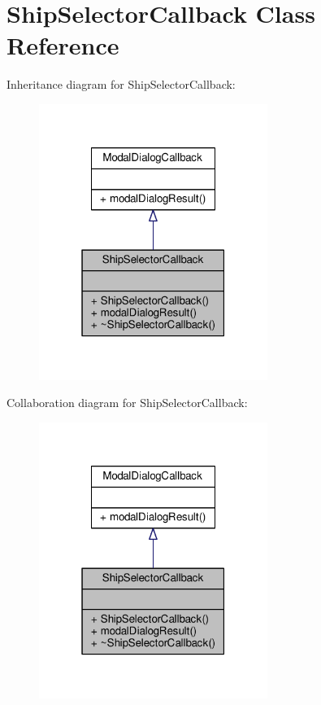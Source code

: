 \hypertarget{classShipSelectorCallback}{}\section{Ship\+Selector\+Callback Class Reference}
\label{classShipSelectorCallback}


Inheritance diagram for Ship\+Selector\+Callback\+:
\nopagebreak
\begin{figure}[H]
\begin{center}
\leavevmode
\includegraphics[width=211pt]{df/dfc/classShipSelectorCallback__inherit__graph}
\end{center}
\end{figure}


Collaboration diagram for Ship\+Selector\+Callback\+:
\nopagebreak
\begin{figure}[H]
\begin{center}
\leavevmode
\includegraphics[width=211pt]{d0/dd2/classShipSelectorCallback__coll__graph}
\end{center}
\end{figure}
